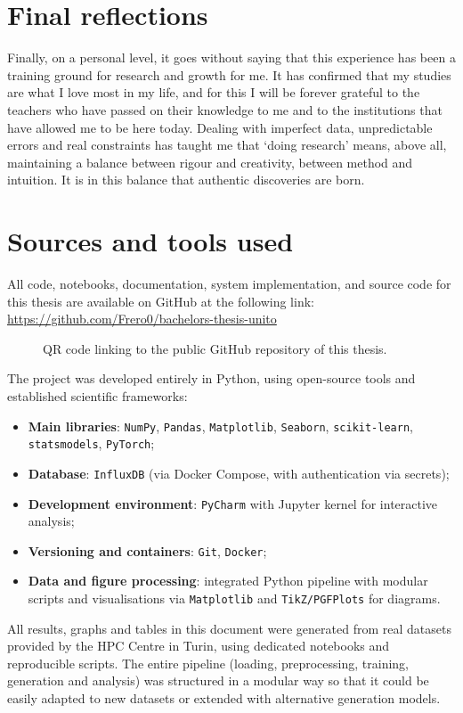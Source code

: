 \section{Final reflections}
Finally, on a personal level, it goes without saying that this experience has been a training ground for research and growth for me.  
It has confirmed that my studies are what I love most in my life, and for this I will be forever grateful to the teachers who have passed on their knowledge to me and to the institutions that have allowed me to be here today.  
Dealing with imperfect data, unpredictable errors and real constraints has taught me that ‘doing research’ means, above all, maintaining a balance between rigour and creativity, between method and intuition.  
It is in this balance that authentic discoveries are born.

\section{Sources and tools used}

All code, notebooks, documentation, system implementation, and source code for this thesis are available on GitHub at the following link:  
\url{https://github.com/Frero0/bachelors-thesis-unito}

\begin{figure}[H]
\centering
{}
\caption{QR code linking to the public GitHub repository of this thesis.}
\label{fig:qr_repo}
\end{figure}
The project was developed entirely in Python, using open-source tools and established scientific frameworks:
\begin{itemize}
  \item \textbf{Main libraries}: \texttt{NumPy}, \texttt{Pandas}, \texttt{Matplotlib}, \texttt{Seaborn}, \texttt{scikit-learn},\\ \texttt{statsmodels}, \texttt{PyTorch};
  \item \textbf{Database}: \texttt{InfluxDB} (via Docker Compose, with authentication via secrets);
  \item \textbf{Development environment}: \texttt{PyCharm} with Jupyter kernel for interactive analysis;
  \item \textbf{Versioning and containers}: \texttt{Git}, \texttt{Docker};
  \item \textbf{Data and figure processing}: integrated Python pipeline with modular scripts and visualisations via \texttt{Matplotlib} and \texttt{TikZ/PGFPlots} for diagrams.
\end{itemize}
All results, graphs and tables in this document were generated from real datasets provided by the HPC Centre in Turin, using dedicated notebooks and reproducible scripts.  
The entire pipeline (loading, preprocessing, training, generation and analysis) was structured in a modular way so that it could be easily adapted to new datasets or extended with alternative generation models.

